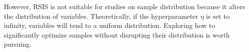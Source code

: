 \documentclass[lettersize,journal]{IEEEtran}
\begin{document}
However, RSIS is not 
suitable for studies on sample distribution because it alters 
the distribution of variables. Theoretically, if the 
hyperparameter $\eta$ is set to infinity, variables will 
tend to a uniform distribution. Exploring how to significantly 
optimize samples without disrupting their distribution is worth 
pursuing.








\appendix
\end{document}
